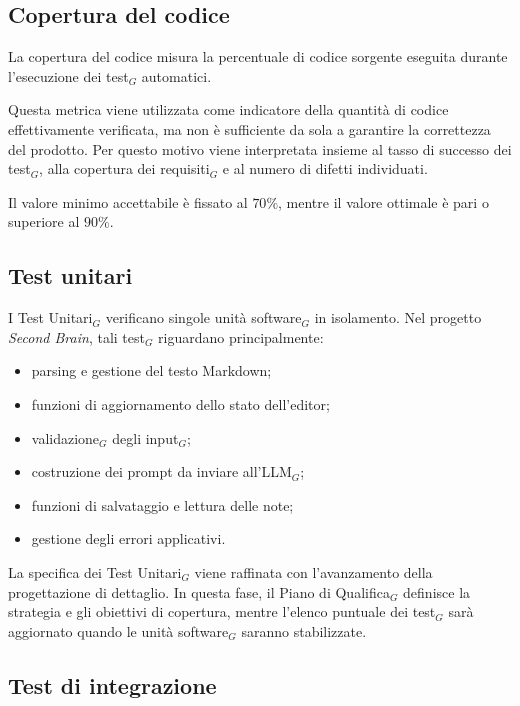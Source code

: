 \documentclass[a4paper, 10pt, colorlinks=true, linkcolor=black, urlcolor=blue, citecolor=blue, hidelinks]{article}
\begin{document}
\subsection{Copertura del codice}

La copertura del codice misura la percentuale di codice sorgente eseguita durante l'esecuzione dei test$_G$ automatici.

Questa metrica viene utilizzata come indicatore della quantità di codice effettivamente verificata, ma non è sufficiente da sola a garantire la correttezza del prodotto. Per questo motivo viene interpretata insieme al tasso di successo dei test$_G$, alla copertura dei requisiti$_G$ e al numero di difetti individuati.

Il valore minimo accettabile è fissato al $70\%$, mentre il valore ottimale è pari o superiore al $90\%$.

\subsection{Test unitari}

I Test Unitari$_G$ verificano singole unità software$_G$ in isolamento. Nel progetto \textit{Second Brain}, tali test$_G$ riguardano principalmente:
\begin{itemize}
    \item parsing e gestione del testo Markdown;
    \item funzioni di aggiornamento dello stato dell'editor;
    \item validazione$_G$ degli input$_G$;
    \item costruzione dei prompt da inviare all'LLM$_G$;
    \item funzioni di salvataggio e lettura delle note;
    \item gestione degli errori applicativi.
\end{itemize}

La specifica dei Test Unitari$_G$ viene raffinata con l'avanzamento della progettazione di dettaglio. In questa fase, il Piano di Qualifica$_G$ definisce la strategia e gli obiettivi di copertura, mentre l'elenco puntuale dei test$_G$ sarà aggiornato quando le unità software$_G$ saranno stabilizzate.

\subsection{Test di integrazione}

\end{document}
